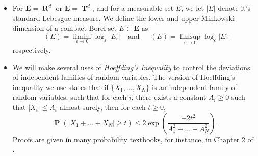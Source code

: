 \documentclass[12pt,reqno]{article}
\numberwithin{equation}{section}
\DeclareMathOperator{\lowminkdim}{\underline{\dim}_{\mathbf{M}}}
\DeclareMathOperator{\upminkdim}{\overline{\dim}_{\mathbf{M}}}
\DeclareMathOperator{\RR}{\mathbf{R}}
\DeclareMathOperator{\TT}{\mathbf{T}}
\DeclareMathOperator{\EE}{\mathbf{E}}
\DeclareMathOperator{\PP}{\mathbf{P}}
\newcommand{\psitwo}[1]{\| {#1} \|_{\psi_2(L)}}
\begin{document}
\begin{itemize}
    \item For $\mathbf{E} = \RR^d$ or $\mathbf{E} = \TT^d$, and for a measurable set $E$, we let $|E|$ denote it's standard Lebesgue measure. We define the lower and upper Minkowski dimension of a compact Borel set $E \subset \mathbf{E}$ as
    \[ \lowminkdim(E) = \liminf_{\varepsilon \to 0} \log_\varepsilon|E_\varepsilon| \quad\text{and}\quad \upminkdim(E) = \limsup_{\varepsilon \to 0} \log_\varepsilon |E_\varepsilon| \]
    respectively.

    \item We will make several uses of \emph{Hoeffding's Inequality} to control the deviations of independent families of random variables. The version of Hoeffding's inequality we use states that if $\{ X_1, \dots, X_N \}$ is an independent family of random variables, such that for each $i$, there exists a constant $A_i \geq 0$ such that $|X_i| \leq A_i$ almost surely, then for each $t \geq 0$,
    \[ \PP \left( |X_1 + \dots + X_N| \geq t \right) \leq 2 \exp \left(\frac{-2t^2}{A_1^2 + \dots + A_N^2} \right). \]
    Proofs are given in many probability textbooks, for instance, in Chapter 2 of \cite{Vershynin}.
    \begin{comment}

    \item Our random construction involves a probabilistic concentration of measure argument. Define a convex function $\psi_2: [0,\infty) \to [0,\infty)$ by setting
    \[ \psi_2(t) = e^{t^2} - 1, \]
    The function $\psi_2$ induces an Orlicz norm on the family of scalar valued random variables over a probability space by setting, for each random variable $X$,
    \[ \psitwo{X} = \inf \left\{ A \in (0,\infty) : \EE(\psi_2(|X|/A)) \leq 1 \right\}. \]
    The family of random variables with $\psitwo{X} < \infty$ are known as \emph{subgaussian random variables}. Here are the important properties of subgaussian random variables which we use in this paper:
    \begin{itemize}
        \item If $\psitwo{X} \leq A$, then for each $t \geq 0$,
        \[ \PP \left( |X| \geq t \right) \leq 10 \exp \left( -t^2/10A^2 \right). \]
        Thus Subgaussian random variables have Gaussian tails.

        \item If $|X| \leq A$ almost surely, then $\psitwo{X} \leq 10 A$. Thus bounded random variables are subgaussian.


\end{comment}
\end{itemize}
\end{document}
